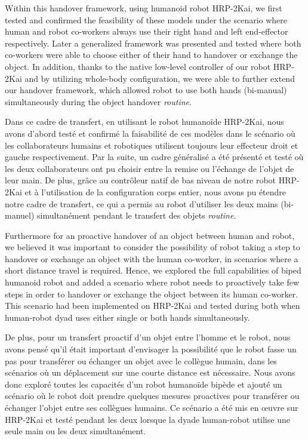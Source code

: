 Within this handover framework, using humanoid robot HRP-2Kai, we first tested and confirmed the feasibility of these models under the scenario where human and robot co-workers always use their right hand and left end-effector respectively. Later a generalized framework was presented and tested where both co-workers were able to choose either of their hand to handover or exchange the object. In addition, thanks to the native low-level controller of our robot HRP-2Kai and by utilizing whole-body configuration, we were able to further extend our handover framework, which allowed robot to use both hands  (bi-manual) simultaneously during the object handover \textit{routine}.

Dans ce cadre de transfert, en utilisant le robot humanoïde HRP-2Kai, nous avons d'abord testé et confirmé la faisabilité de ces modèles dans le scénario où les collaborateurs humains et robotiques utilisent toujours leur effecteur droit et gauche respectivement. Par la suite, un cadre généralisé a été présenté et testé où les deux collaborateurs ont pu choisir entre la remise ou l'échange de l'objet de leur main. De plus, grâce au contrôleur natif de bas niveau de notre robot HRP-2Kai et à l'utilisation de la configuration corps entier, nous avons pu étendre notre cadre de transfert, ce qui a permis au robot d'utiliser les deux mains (bi-manuel) simultanément pendant le transfert des objets \textit{routine}.


Furthermore for an proactive handover of an object between human and robot, we believed it was important to consider the possibility of robot taking a step to handover or exchange an object with the human co-worker, in scenarios where a short distance travel is required. Hence, we explored the full capabilities of biped humanoid robot and added a scenario where robot needs to proactively take few steps in order to handover or exchange the object between its human co-worker. This scenario had been implemented on HRP-2Kai and tested during both when human-robot dyad uses either single or both hands simultaneously. 

De plus, pour un transfert proactif d'un objet entre l'homme et le robot, nous avons pensé qu'il était important d'envisager la possibilité que le robot fasse un pas pour transférer ou échanger un objet avec le collègue humain, dans les scénarios où un déplacement sur une courte distance est nécessaire. Nous avons donc exploré toutes les capacités d'un robot humanoïde bipède et ajouté un scénario où le robot doit prendre quelques mesures proactives pour transférer ou échanger l'objet entre ses collègues humains. Ce scénario a été mis en œuvre sur HRP-2Kai et testé pendant les deux lorsque la dyade human-robot utilise une seule main ou les deux simultanément. 




